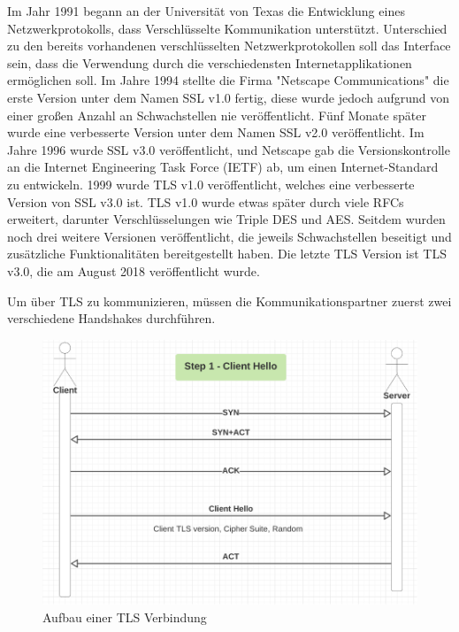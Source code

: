 Im Jahr 1991 begann an der Universität von Texas die Entwicklung eines Netzwerkprotokolls, dass Verschlüsselte Kommunikation unterstützt. Unterschied zu den bereits vorhandenen verschlüsselten Netzwerkprotokollen soll das Interface sein, dass die Verwendung durch die verschiedensten Internetapplikationen ermöglichen soll. Im Jahre 1994 stellte die Firma "Netscape Communications" die erste Version unter dem Namen SSL v1.0 fertig, diese wurde jedoch aufgrund von einer großen Anzahl an Schwachstellen nie veröffentlicht. Fünf Monate später wurde eine verbesserte Version unter dem Namen SSL v2.0 veröffentlicht. Im Jahre 1996 wurde SSL v3.0 veröffentlicht, und Netscape gab die Versionskontrolle an die Internet Engineering Task Force (IETF) ab, um einen Internet-Standard zu entwickeln. 1999 wurde TLS v1.0 veröffentlicht, welches eine verbesserte Version von SSL v3.0 ist. TLS v1.0 wurde etwas später durch viele RFCs erweitert, darunter Verschlüsselungen wie Triple DES und AES. Seitdem wurden noch drei weitere Versionen veröffentlicht, die jeweils Schwachstellen beseitigt und zusätzliche Funktionalitäten bereitgestellt haben. Die letzte TLS Version ist TLS v3.0, die am August 2018 veröffentlicht wurde. 

Um über TLS zu kommunizieren, müssen die Kommunikationspartner zuerst zwei verschiedene Handshakes durchführen. 

\begin{figure}[H]
    \centering
    \includegraphics{media/OpenSSL/VerbindungsAufbau.png}
    \caption{Aufbau einer TLS Verbindung}
\end{figure}

